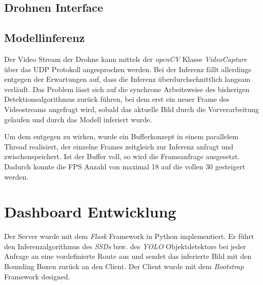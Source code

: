 \subsection*{Drohnen Interface}

\subsection*{Modellinferenz}

Der Video Stream der Drohne kann mittels der \textit{openCV} Klasse \textit{VideoCapture} über das UDP Protokoll angesprochen werden. Bei der Inferenz fällt allerdings entgegen der Erwartungen auf, dass die Inferenz überdurchschnittlich langsam verläuft. Das Problem lässt sich auf die synchrone Arbeitsweise des bisherigen Detektionsalgorithmus zurück führen, bei dem erst ein neuer Frame des Videostreams angefragt wird, sobald das aktuelle Bild durch die Vorverarbeitung gelaufen und durch das Modell inferiert wurde. 

Um dem entgegen zu wirken, wurde ein Bufferkonzept in einem parallelem Thread realisiert, der einzelne Frames zeitgleich zur Inferenz anfragt und zwischenspeichert. Ist der Buffer voll, so wird die Frameanfrage ausgesetzt. Dadurch konnte die FPS Anzahl von maximal 18 auf die vollen 30 gesteigert werden. 

\section{Dashboard Entwicklung}

Der Server wurde mit dem \textit{Flask} Framework in Python implementiert. Er führt den Inferenzalgorithmus des \textit{SSDs} bzw. des \textit{YOLO} Objektdetektors bei jeder Anfrage an eine vordefinierte Route aus und sendet das inferierte Bild mit den Bounding Boxen zurück an den Client. Der Client wurde mit dem \textit{Bootstrap} Framework designed. 
